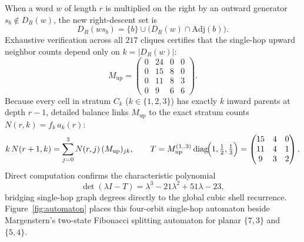 When a word $w$ of length $r$ is multiplied on the right by an outward generator $s_b \notin D_R(w)$, the new right-descent set is
\begin{equation}
\label{eq:right-descent-step}
D_R(w s_b) = \{b\} \cup \bigl(D_R(w) \cap \mathrm{Adj}(b)\bigr).
\end{equation}
Exhaustive verification across all $217$ cliques certifies that the single-hop upward neighbor counts depend only on $k = |D_R(w)|$:
\begin{equation}
\label{eq:m-up}
M_{\mathrm{up}} =
\begin{pmatrix}
0 & 24 & 0 & 0 \\
0 & 15 & 8 & 0 \\
0 & 11 & 8 & 3 \\
0 & 9 & 6 & 6
\end{pmatrix}.
\end{equation}
Because every cell in stratum $C_k$ ($k \in \{1,2,3\}$) has exactly $k$ inward parents at depth $r-1$, detailed balance links $M_{\mathrm{up}}$ to the exact stratum counts $N(r,k) = f_k\,a_k(r)$:
\begin{equation}
\label{eq:detailed-balance}
k\,N(r+1, k) = \sum_{j=0}^{3} N(r, j)\,(M_{\mathrm{up}})_{jk}, \qquad
T = M_{\mathrm{up}}^{(1..3)}\operatorname{diag}\!\Bigl(1,\tfrac{1}{2},\tfrac{1}{3}\Bigr) =
\begin{pmatrix}
15 & 4 & 0 \\
11 & 4 & 1 \\
9 & 3 & 2
\end{pmatrix}.
\end{equation}
Direct computation confirms the characteristic polynomial
\begin{equation}
\label{eq:t-charpoly}
\det(\lambda I - T) = \lambda^3 - 21\lambda^2 + 51\lambda - 23,
\end{equation}
bridging single-hop graph degrees directly to the global cubic shell recurrence. Figure~\ref{fig:automaton} places this four-orbit single-hop automaton beside Margenstern's two-state Fibonacci splitting automaton for planar $\{7,3\}$ and $\{5,4\}$.

